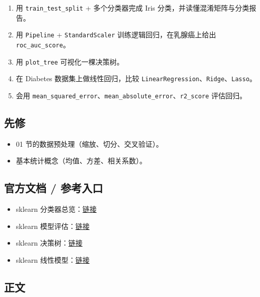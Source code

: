 \begin{enumerate}
\def\labelenumi{\arabic{enumi}.}
\tightlist
\item
  用 \texttt{train\_test\_split} + 多个分类器完成 Iris
  分类，并读懂混淆矩阵与分类报告。
\item
  用 \texttt{Pipeline} + \texttt{StandardScaler}
  训练逻辑回归，在乳腺癌上给出 \texttt{roc\_auc\_score}。
\item
  用 \texttt{plot\_tree} 可视化一棵决策树。
\item
  在 Diabetes 数据集上做线性回归，比较
  \texttt{LinearRegression}、\texttt{Ridge}、\texttt{Lasso}。
\item
  会用
  \texttt{mean\_squared\_error}、\texttt{mean\_absolute\_error}、\texttt{r2\_score}
  评估回归。
\end{enumerate}

\subsection{先修}\label{ux5148ux4fee-22}

\begin{itemize}
\tightlist
\item
  01 节的数据预处理（缩放、切分、交叉验证）。
\item
  基本统计概念（均值、方差、相关系数）。
\end{itemize}

\subsection{官方文档 /
参考入口}\label{ux5b98ux65b9ux6587ux6863-ux53c2ux8003ux5165ux53e3-8}

\begin{itemize}
\tightlist
\item
  sklearn
  分类器总览：\href{https://scikit-learn.org/stable/supervised_learning.html}{链接}
\item
  sklearn
  模型评估：\href{https://scikit-learn.org/stable/modules/model_evaluation.html}{链接}
\item
  sklearn
  决策树：\href{https://scikit-learn.org/stable/modules/tree.html}{链接}
\item
  sklearn
  线性模型：\href{https://scikit-learn.org/stable/modules/linear_model.html}{链接}
\end{itemize}

\subsection{正文}\label{ux6b63ux6587-1}

